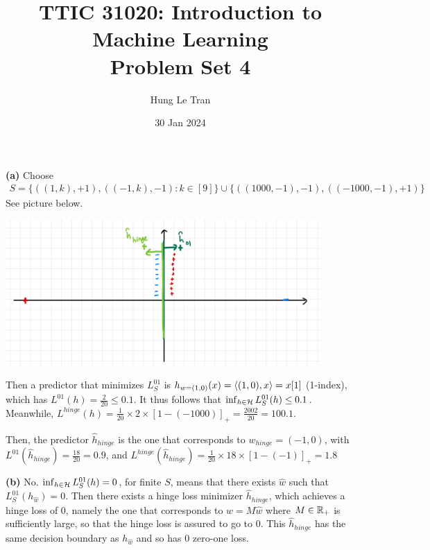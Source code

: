 \documentclass[a4paper, 12pt]{article}
\title{TTIC 31020: Introduction to Machine Learning \\ \large Problem Set 4}
\date{30 Jan 2024}
\author{Hung Le Tran}
\begin{document}
\maketitle
\setcounter{section}{4}
\begin{problem} [Problem 1]
    \textbf{(a)} Choose \begin{multline*}
    S = \{((1, k), +1), ((-1, k), -1): k \in [9]\} \cup \{((1000, -1), -1), ((-1000, -1), +1)\}
    \end{multline*}
    See picture below. 

\begin{center}
    \includegraphics[width=12cm]{./figures/4.1a.jpeg}
\end{center}
    
    Then a predictor that minimizes $L_{S}^{01}$ is $h_{w = (1, 0)}(x) = \langle (1, 0), x \rangle = x[1]$ (1-index), which has $L^{01}(h) = \frac{2}{20} \leq 0.1$. It thus follows that $\inf_{h \in \mathcal{H}} L^{01}_S (h) \leq 0.1$. Meanwhile, $L^{hinge}(h) = \frac{1}{20} \times 2 \times [1 - (-1000)]_+ = \frac{2002}{20} = 100.1$.

    Then, the predictor $\hat{h}_{hinge}$ is the one that corresponds to $w_{hinge} = (-1, 0)$, with $L^{01}(\hat{h}_{hinge}) = \frac{18}{20} = 0.9$, and $L^{hinge}(\hat{h}_{hinge}) = \frac{1}{20} \times 18 \times [1-(-1)]_+ = 1.8$

    \textbf{(b)} No. $\inf_{h \in \mathcal{H}} L_S^{01}(h) = 0$, for finite $S$, means that there exists $\hat{w}$ such that $L_S^{01}(h_{\hat{w}}) = 0$. Then there exists a hinge loss minimizer $\hat{h}_{hinge}$, which achieves a hinge loss of 0, namely the one that corresponds to $w = M\hat{w}$ where $M \in \mathbb{R}_+$ is sufficiently large, so that the hinge loss is assured to go to 0. This $\hat{h}_{hinge}$ has the same decision boundary as $h_{\hat{w}}$ and so has 0 zero-one loss.
\end{problem}
\end{document}
